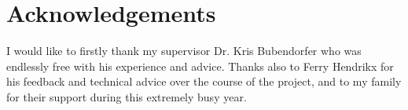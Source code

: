 \chapter*{Acknowledgements}

I would like to firstly thank my supervisor Dr. Kris Bubendorfer who was endlessly free with his experience and advice. Thanks also to Ferry Hendrikx for his feedback and technical advice over the course of the project, and to my family for their support during this extremely busy year. 